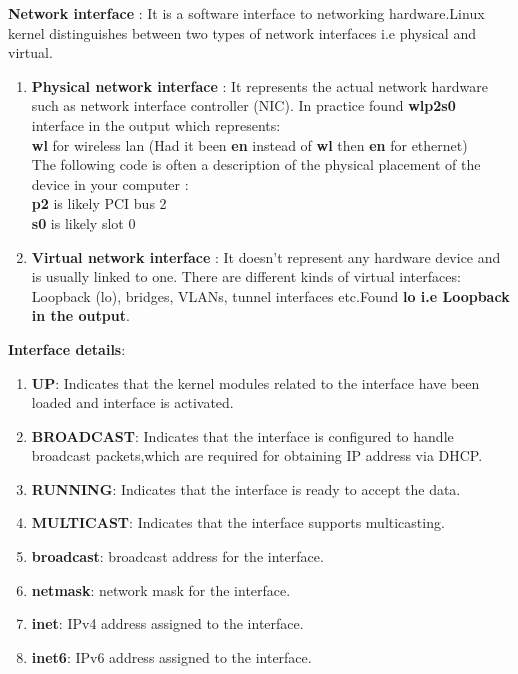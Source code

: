 \documentclass[a4paper,11pt]{article}
\begin{document}
\begin{enumerate}[itemsep=-3pt,label=(\alph*)]
	\textbf{Network interface} : It is a software interface to networking hardware.Linux kernel distinguishes between two types of network interfaces i.e physical and virtual.
	\vspace{-3mm}
	\begin{enumerate}[itemsep=0pt,label=(\roman*)]
	\item \textbf{Physical network interface} : It represents the actual network hardware such as network interface controller (NIC).
	In practice found \textbf{wlp2s0} interface in the output which represents:\\
	\textbf{wl} for wireless lan (Had it been \textbf{en} instead of \textbf{wl} then \textbf{en} for ethernet) \\The following code is often a description of the physical placement of the device in your computer : \\ \textbf{p2} is likely PCI bus 2 \\ \textbf{s0} is likely slot 0
	\item \textbf{Virtual network interface} : It doesn’t represent any hardware device and is usually linked to one. There are different kinds of virtual interfaces: Loopback (lo), bridges, VLANs, tunnel interfaces etc.Found \textbf{lo i.e Loopback in the output}.
    \end{enumerate}\vspace{-2mm}
    \textbf{Interface details}:\vspace{-2mm}
    \begin{enumerate}[itemsep=0pt,label=(\roman*)]
    	\item \textbf{UP}: Indicates that the kernel modules related to the interface have been loaded and interface is activated.
    	\item \textbf{BROADCAST}: Indicates that the interface is configured to handle broadcast packets,which are required for obtaining IP address via DHCP.
    	\item \textbf{RUNNING}: Indicates that the interface is ready to accept the data.
    	\item \textbf{MULTICAST}: Indicates that the interface supports multicasting.
    	\item \textbf{broadcast}: broadcast address for the interface.
    	\item \textbf{netmask}: network mask for the interface.
    	\item \textbf{inet}: IPv4 address assigned to the interface.
    	\item \textbf{inet6}: IPv6 address assigned to the interface.

\end{enumerate}
\end{enumerate}
\end{document}
